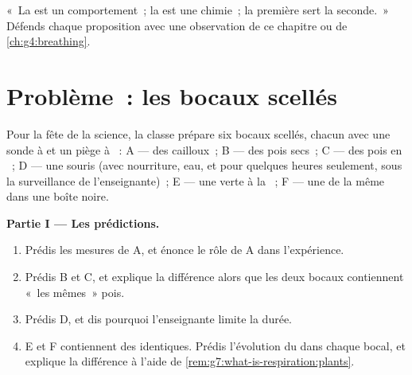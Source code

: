 \begin{exercise}[$\star\star\star$]\label{exo:g7:what-is-respiration:12}
«~La  est un comportement~; la  est une
chimie~; la première sert la seconde.~» Défends chaque proposition
avec une observation de ce chapitre ou de
\cref{ch:g4:breathing}.
\end{exercise}

\section{Problème~: les bocaux scellés}

\begin{problem}\label{pb:g7:what-is-respiration:1}
Pour la fête de la science, la classe prépare six bocaux scellés,
chacun avec une sonde à  et un piège à ~: A ---
des cailloux~; B --- des pois secs~; C --- des pois en ~;
D --- une souris (avec nourriture, eau, et pour quelques heures
seulement, sous la surveillance de l'enseignante)~; E --- une 
verte à la ~; F --- une  de la même  dans une
boîte noire.

\medskip\noindent\textbf{Partie I --- Les prédictions.}
\begin{enumerate}
  \item Prédis les mesures de A, et énonce le rôle de A dans
        l'expérience.
  \item Prédis B et C, et explique la différence alors que les deux
        bocaux contiennent «~les mêmes~» pois.
  \item Prédis D, et dis pourquoi l'enseignante limite la durée.
  \item E et F contiennent des  identiques. Prédis
        l'évolution du  dans chaque bocal, et explique la
        différence à l'aide de
        \cref{rem:g7:what-is-respiration:plants}.
\end{enumerate}


\end{problem}
